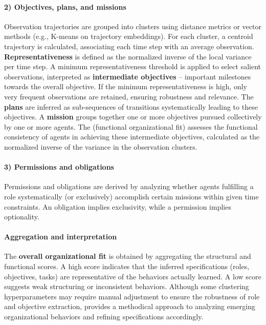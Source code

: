\begin{itemize}
        \paragraph{2) Objectives, plans, and missions}
        Observation trajectories are grouped into clusters using distance metrics or vector methods (e.g., K-means on trajectory embeddings). For each cluster, a centroid trajectory is calculated, associating each time step with an average observation.
        \textbf{Representativeness} is defined as the normalized inverse of the local variance per time step.
        A minimum representativeness threshold is applied to select salient observations, interpreted as \textbf{intermediate objectives} – important milestones towards the overall objective.
        If the minimum representativeness is high, only very frequent observations are retained, ensuring robustness and relevance.
        The \textbf{plans} are inferred as sub-sequences of transitions systematically leading to these objectives.
        A \textbf{mission} groups together one or more objectives pursued collectively by one or more agents.
        The \textbf{} (functional organizational fit) assesses the functional consistency of agents in achieving these intermediate objectives, calculated as the normalized inverse of the variance in the observation clusters.

        \paragraph{3) Permissions and obligations}
        Permissions and obligations are derived by analyzing whether agents fulfilling a role systematically (or exclusively) accomplish certain missions within given time constraints.
        An obligation implies exclusivity, while a permission implies optionality.

        \paragraph{Aggregation and interpretation}
        The \textbf{overall organizational fit} is obtained by aggregating the structural and functional scores.
        A high score indicates that the inferred specifications (roles, objectives, tasks) are representative of the behaviors actually learned.
        A low score suggests weak structuring or inconsistent behaviors.
        Although some clustering hyperparameters may require manual adjustment to ensure the robustness of role and objective extraction,  provides a methodical approach to analyzing emerging organizational behaviors and refining specifications accordingly.



\end{itemize}
